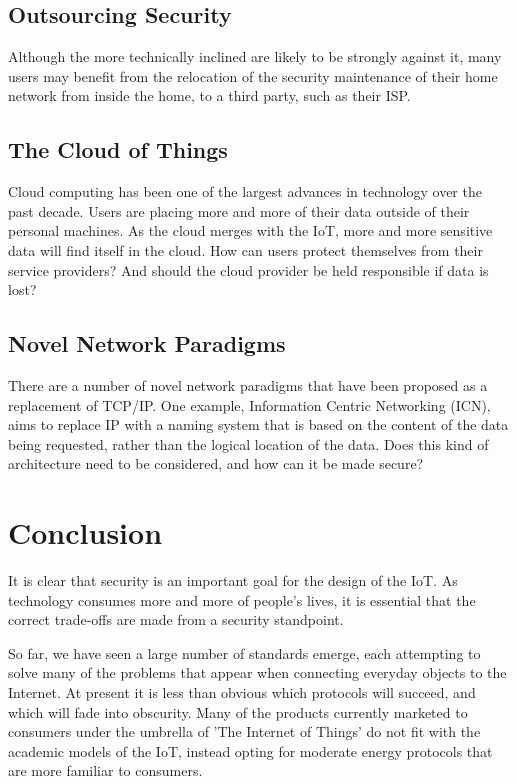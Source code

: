 \documentclass[10pt,journal,compsoc]{IEEEtran}
\begin{document}
\subsection{Outsourcing Security}
Although the more technically inclined are likely to be strongly against it, many
users may benefit from the relocation of the security maintenance of their home
network from inside the home, to a third party, such as their ISP. 

\subsection{The Cloud of Things}
Cloud computing has been one of the largest advances in technology over the
past decade. Users are placing more and more of their data outside of their
personal machines. As the cloud merges with the IoT, more and more sensitive
data will find itself in the cloud. How can users protect themselves from their
service providers? And should the cloud provider be held responsible if data is
lost?

\subsection{Novel Network Paradigms}
There are a number of novel network paradigms that have been proposed as a
replacement of TCP/IP. One example, Information Centric Networking (ICN), aims
to replace IP with a naming system that is based on the content of the data
being requested, rather than the logical location of the data. Does this kind of
architecture need to be considered, and how can it be made secure?


\section{Conclusion}
It is clear that security is an important goal for the design of the IoT. As
technology consumes more and more of people's lives, it is essential that the
correct trade-offs are made from a security standpoint. 

So far, we have seen a large number of standards emerge, each attempting to
solve many of the problems that appear when connecting everyday objects to the
Internet. At present it is less than obvious which protocols will succeed, and
which will fade into obscurity. Many of the products currently marketed to
consumers under the umbrella of 'The Internet of Things' do not fit with the
academic models of the IoT, instead opting for moderate energy protocols that
are more familiar to consumers. 
\end{document}
